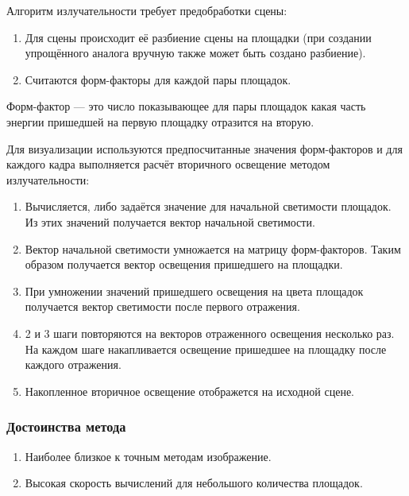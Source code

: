 \documentclass[12pt,fleqn]{article}
\begin{document}
Алгоритм излучательности требует предобработки сцены:

\begin{enumerate}

\item Для сцены происходит её разбиение сцены на площадки (при создании упрощённого аналога вручную также может быть создано разбиение).

\item Считаются форм-факторы для каждой пары площадок.

\end{enumerate}

Форм-фактор --- это число показывающее для пары площадок какая часть энергии пришедшей на первую площадку отразится на вторую.

Для визуализации используются предпосчитанные значения форм-факторов и для каждого кадра выполняется расчёт вторичного освещение методом излучательности:

\begin{enumerate}

\item Вычисляется, либо задаётся значение для начальной светимости площадок. Из этих значений получается вектор начальной светимости.

\item Вектор начальной светимости умножается на матрицу форм-факторов. Таким образом получается вектор освещения пришедшего на площадки.

\item При умножении значений пришедшего освещения на цвета площадок получается вектор светимости после первого отражения.

\item 2 и 3 шаги повторяются на векторов отраженного освещения несколько раз. На каждом шаге накапливается освещение пришедшее на площадку после каждого отражения.

\item Накопленное вторичное освещение отображется на исходной сцене.

\end{enumerate}

\subsubsection{Достоинства метода}

\begin{enumerate}

\item Наиболее близкое к точным методам изображение.

\item Высокая скорость вычислений для небольшого количества площадок.

\end{enumerate}
\end{document}
